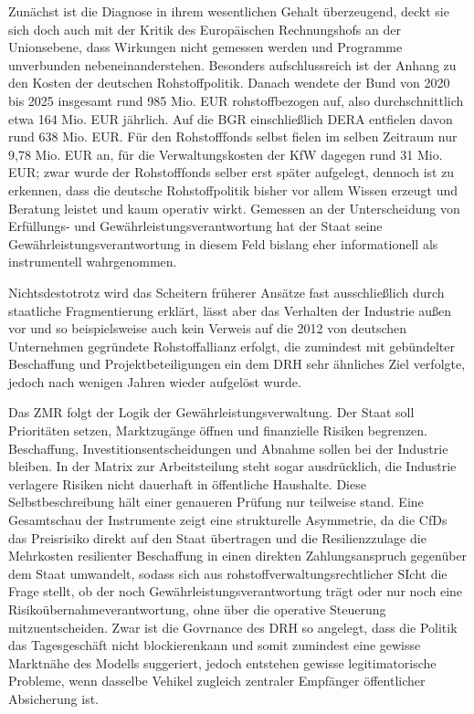 \documentclass[12pt,a4paper,oneside]{book} %
\begin{document}
{Zunächst ist die Diagnose in ihrem wesentlichen Gehalt überzeugend, deckt sie sich doch auch mit der Kritik des Europäischen Rechnungshofs an der Unionsebene, dass Wirkungen nicht gemessen werden und Programme unverbunden nebeneinanderstehen. Besonders aufschlussreich ist der Anhang zu den Kosten der deutschen Rohstoffpolitik. Danach wendete der Bund von 2020 bis 2025 insgesamt rund 985 Mio. EUR rohstoffbezogen auf, also durchschnittlich etwa 164 Mio. EUR jährlich. Auf die BGR einschließlich DERA entfielen davon rund 638 Mio. EUR. Für den Rohstofffonds selbst fielen im selben Zeitraum nur 9,78 Mio. EUR an, für die Verwaltungskosten der KfW dagegen rund 31 Mio. EUR; zwar wurde der Rohstofffonds selber erst später aufgelegt, dennoch ist zu erkennen, dass die deutsche Rohstoffpolitik bisher vor allem Wissen erzeugt und Beratung leistet und kaum operativ wirkt. Gemessen an der Unterscheidung von Erfüllungs- und Gewährleistungsverantwortung hat der Staat seine Gewährleistungsverantwortung in diesem Feld bislang eher informationell als instrumentell wahrgenommen.

Nichtsdestotrotz wird das Scheitern früherer Ansätze fast ausschließlich durch staatliche Fragmentierung erklärt, lässt aber das Verhalten der Industrie außen vor und so beispielsweise auch kein Verweis auf die 2012 von deutschen Unternehmen gegründete Rohstoffallianz erfolgt, die zumindest mit gebündelter Beschaffung und Projektbeteiligungen ein dem DRH sehr ähnliches Ziel verfolgte, jedoch nach wenigen Jahren wieder aufgelöst wurde.

Das ZMR folgt der Logik der Gewährleistungsverwaltung. Der Staat soll Prioritäten setzen, Marktzugänge öffnen und finanzielle Risiken begrenzen. Beschaffung, Investitionsentscheidungen und Abnahme sollen bei der Industrie bleiben. In der Matrix zur Arbeitsteilung steht sogar ausdrücklich, die Industrie verlagere Risiken nicht dauerhaft in öffentliche Haushalte. Diese Selbstbeschreibung hält einer genaueren Prüfung nur teilweise stand. Eine Gesamtschau der Instrumente zeigt eine strukturelle Asymmetrie, da die CfDs das Preisrisiko direkt auf den Staat übertragen und die Resilienzzulage die Mehrkosten resilienter Beschaffung in einen direkten Zahlungsanspruch gegenüber dem Staat umwandelt, sodass sich aus rohstoffverwaltungsrechtlicher SIcht die Frage stellt, ob der noch Gewährleistungsverantwortung trägt oder nur noch eine Risikoübernahmeverantwortung, ohne über die operative Steuerung mitzuentscheiden. Zwar ist die Govrnance des DRH so angelegt, dass die Politik das Tagesgeschäft nicht \glqq blockieren\grqq kann und somit zumindest eine gewisse Marktnähe des Modells suggeriert, jedoch entstehen gewisse legitimatorische Probleme, wenn dasselbe Vehikel zugleich zentraler Empfänger öffentlicher Absicherung ist. 

}
\end{document}
